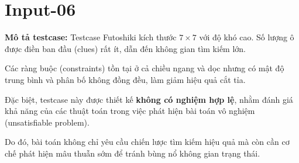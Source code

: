 \section{Input-06}
\textbf{Mô tả testcase:}
Testcase Futoshiki kích thước $7 \times 7$ với độ khó cao. Số lượng ô được điền ban đầu (clues) rất ít, dẫn đến không gian tìm kiếm lớn.

Các ràng buộc (constraints) tồn tại ở cả chiều ngang và dọc nhưng có mật độ trung bình và phân bố không đồng đều, làm giảm hiệu quả cắt tỉa.

Đặc biệt, testcase này được thiết kế \textbf{không có nghiệm hợp lệ}, nhằm đánh giá khả năng của các thuật toán trong việc phát hiện bài toán vô nghiệm (unsatisfiable problem).

Do đó, bài toán không chỉ yêu cầu chiến lược tìm kiếm hiệu quả mà còn cần cơ chế phát hiện mâu thuẫn sớm để tránh bùng nổ không gian trạng thái.

\begin{center}
\end{center}

